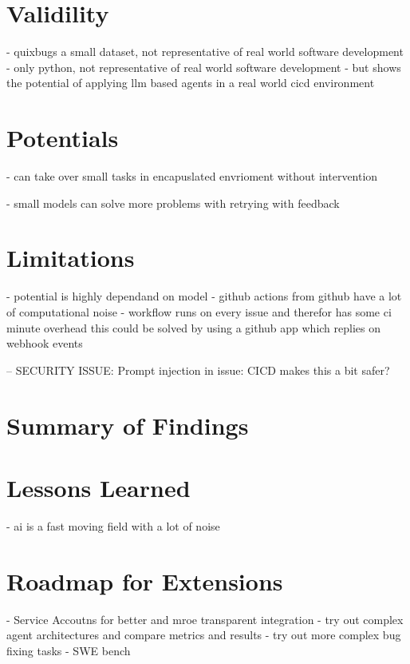 \section{Validility}
- quixbugs a small dataset, not representative of real world software development
- only python, not representative of real world software development
- but shows the potential of applying llm based agents in a real world cicd environment

\section{Potentials}
- can take over small tasks in encapuslated envrioment without intervention

- small models can solve more problems with retrying with feedback

\section{Limitations}
- potential is highly dependand on model
- github actions from github have a lot of computational noise
- workflow runs on every issue and therefor has some ci minute overhead this could be solved by using a github app which replies on webhook events

-- SECURITY ISSUE: Prompt injection in issue: CICD makes this a bit safer?

\section{Summary of Findings}
\section{Lessons Learned}
- ai is a fast moving field with a lot of noise


\section{Roadmap for Extensions}
- Service Accoutns for better and mroe transparent integration
- try out complex agent architectures and compare metrics and results
- try out more complex bug fixing tasks - SWE bench